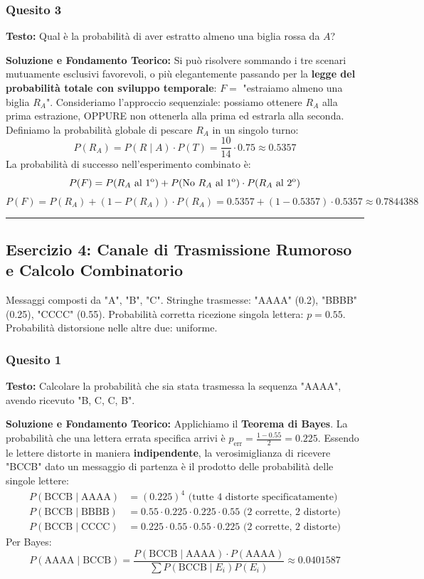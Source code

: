 \documentclass[12pt, a4paper]{article}
\begin{document}
\subsubsection*{Quesito 3}
\textbf{Testo:} Qual è la probabilità di aver estratto almeno una biglia rossa da $A$?

\textbf{Soluzione e Fondamento Teorico:} 
Si può risolvere sommando i tre scenari mutuamente esclusivi favorevoli, o più elegantemente passando per la \textbf{legge del probabilità totale con sviluppo temporale}:
$F = $ "estraiamo almeno una biglia $R_A$".
Consideriamo l'approccio sequenziale: possiamo ottenere $R_A$ alla prima estrazione, OPPURE non ottenerla alla prima ed estrarla alla seconda.
Definiamo la probabilità globale di pescare $R_A$ in un singolo turno:
$$ P(R_A) = P(R \mid A) \cdot P(T) = \frac{10}{14} \cdot 0.75 \approx 0.5357 $$
La probabilità di successo nell'esperimento combinato è:
$$ P(F) = P(R_A \text{ al 1\textsuperscript{o}}) + P(\text{No } R_A \text{ al 1\textsuperscript{o}}) \cdot P(R_A \text{ al 2\textsuperscript{o}}) $$
$$ P(F) = P(R_A) + (1 - P(R_A)) \cdot P(R_A) = 0.5357 + (1 - 0.5357) \cdot 0.5357 \approx 0.7844388 $$

\vspace{0.5cm}\hrule\vspace{0.5cm}

\subsection*{Esercizio 4: Canale di Trasmissione Rumoroso e Calcolo Combinatorio}
Messaggi composti da "A", "B", "C". Stringhe trasmesse: "AAAA" (0.2), "BBBB" (0.25), "CCCC" (0.55). Probabilità corretta ricezione singola lettera: $p = 0.55$. Probabilità distorsione nelle altre due: uniforme.

\subsubsection*{Quesito 1}
\textbf{Testo:} Calcolare la probabilità che sia stata trasmessa la sequenza "AAAA", avendo ricevuto "B, C, C, B".

\textbf{Soluzione e Fondamento Teorico:} 
Applichiamo il \textbf{Teorema di Bayes}. La probabilità che una lettera errata specifica arrivi è $p_{\text{err}} = \frac{1 - 0.55}{2} = 0.225$.
Essendo le lettere distorte in maniera \textbf{indipendente}, la verosimiglianza di ricevere "BCCB" dato un messaggio di partenza è il prodotto delle probabilità delle singole lettere:
\begin{align*}
    P(\text{BCCB} \mid \text{AAAA}) &= (0.225)^4 \text{ (tutte 4 distorte specificatamente)} \\
    P(\text{BCCB} \mid \text{BBBB}) &= 0.55 \cdot 0.225 \cdot 0.225 \cdot 0.55 \text{ (2 corrette, 2 distorte)} \\
    P(\text{BCCB} \mid \text{CCCC}) &= 0.225 \cdot 0.55 \cdot 0.55 \cdot 0.225 \text{ (2 corrette, 2 distorte)}
\end{align*}
Per Bayes:
$$ P(\text{AAAA} \mid \text{BCCB}) = \frac{P(\text{BCCB} \mid \text{AAAA}) \cdot P(\text{AAAA})}{\sum P(\text{BCCB} \mid E_i)P(E_i)} \approx 0.0401587 $$
\end{document}
